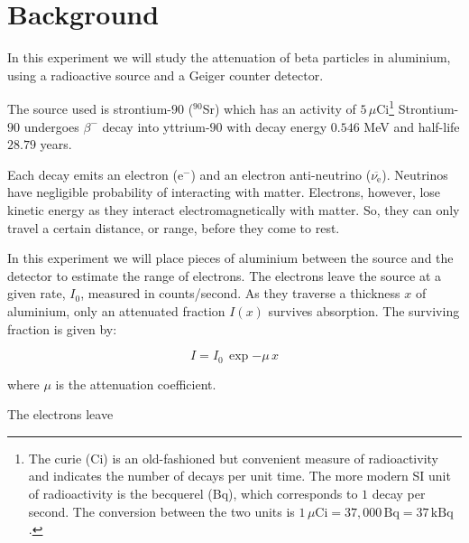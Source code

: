 \section{Background}%

In this experiment we will study the attenuation of beta particles in aluminium, using a radioactive source and a Geiger counter detector. 

The source used is strontium-$90$ ($^{90}$Sr) which has an activity of $5\,\mu$Ci\footnote{The curie (Ci) is an old-fashioned but convenient measure of radioactivity and indicates the number of decays per unit time. The more modern SI unit of radioactivity is the becquerel (Bq), which corresponds to $1$ decay per second. The conversion between the two units is $1\,\mu\textrm{Ci} = 37,000\,\textrm{Bq} = 37\,\textrm{kBq}$.} Strontium-$90$ undergoes $\beta^{-}$ decay into yttrium-$90$ with decay energy $0.546$ MeV and half-life $28.79$ years. 

Each decay emits an electron ($\mathrm{e}^-$)  and an electron anti-neutrino ($\overbar{\nu_\mathrm{e}}$). Neutrinos have negligible probability of interacting with matter. Electrons, however, lose kinetic energy as they interact electromagnetically with matter. So, they can only travel a certain distance, or range, before they come to rest.

In this experiment we will place pieces of aluminium between the source and the detector to estimate the range of electrons.  The electrons leave the source at a given rate, $I_0$, measured in counts/second. As they traverse a thickness $x$ of aluminium, only an attenuated fraction $I(x)$ survives absorption. The surviving fraction is given by:

\begin{displaymath}
I=I_0\,\exp{-\mu\,x}
\end{displaymath}

where $\mu$ is the attenuation coefficient.

The electrons leave 

